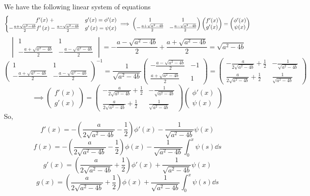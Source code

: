\documentclass{article}
\begin{document}
We have the following linear system of equations
\[\begin{cases}
  \hspace{4.8em}f'(x)\,\,+&g'(x) = \phi'(x)\\
  - \frac{a+\sqrt{a^2-4b}}{2}f'\left(x\right) -
  \frac{a-\sqrt{a^2-4b}}{2}&g'\left(x\right) = \psi(x)\end{cases}
\implies \begin{pmatrix}1&1 \\ - \frac{a+\sqrt{a^2-4b}}{2} & -
  \frac{a-\sqrt{a^2-4b}}{2}\end{pmatrix}\begin{pmatrix}
  f'(x)\\g'(x)\end{pmatrix}
= \begin{pmatrix}\phi'(x)\\\psi(x)\end{pmatrix}\]
\[\begin{vmatrix}1&1 \\ - \frac{a+\sqrt{a^2-4b}}{2} & -
  \frac{a-\sqrt{a^2-4b}}{2}\end{vmatrix} =-
  \frac{a-\sqrt{a^2-4b}}{2} +
  \frac{a+\sqrt{a^2-4b}}{2} = \sqrt{a^2-4b} \]
\[\begin{pmatrix}1&1 \\ - \frac{a+\sqrt{a^2-4b}}{2} & -
  \frac{a-\sqrt{a^2-4b}}{2}\end{pmatrix}^{-1} = \frac{1}{\sqrt{a^2-4b}}\begin{pmatrix}-
  \frac{a-\sqrt{a^2-4b}}{2}&-1 \\  \frac{a+\sqrt{a^2-4b}}{2} &
  1\end{pmatrix} = \begin{pmatrix}-
  \frac{a}{2\sqrt{a^2-4b}} + \frac{1}{2}&-\frac{1}{\sqrt{a^2-4b}} \\
  \frac{a}{2\sqrt{a^2-4b}}+\frac{1}{2} &
  \frac{1}{\sqrt{a^2-4b}}\end{pmatrix}\]
\[\implies \begin{pmatrix}
  f'(x)\\g'(x)\end{pmatrix}
= \begin{pmatrix}-
  \frac{a}{2\sqrt{a^2-4b}} + \frac{1}{2}&-\frac{1}{\sqrt{a^2-4b}} \\
  \frac{a}{2\sqrt{a^2-4b}}+\frac{1}{2} &
  \frac{1}{\sqrt{a^2-4b}}\end{pmatrix}\begin{pmatrix}\phi'(x)\\\psi(x)\end{pmatrix} \]
So,
\[f'(x) = -\left(
  \frac{a}{2\sqrt{a^2-4b}} - \frac{1}{2}\right)\phi'(x)-\frac{1}{\sqrt{a^2-4b}}\psi(x)\]
\[f(x) = -\left(
  \frac{a}{2\sqrt{a^2-4b}} - \frac{1}{2}\right)\phi(x)-\frac{1}{\sqrt{a^2-4b}}\int_0^x\psi(s)\dd{s}\]
\[g'(x) = \left(
  \frac{a}{2\sqrt{a^2-4b}} + \frac{1}{2}\right)\phi'(x)+\frac{1}{\sqrt{a^2-4b}}\psi(x)\]
\[g(x) = \left(
  \frac{a}{2\sqrt{a^2-4b}} + \frac{1}{2}\right)\phi(x) +\frac{1}{\sqrt{a^2-4b}}\int_0^x\psi(s)\dd{s}\]
\end{document}
